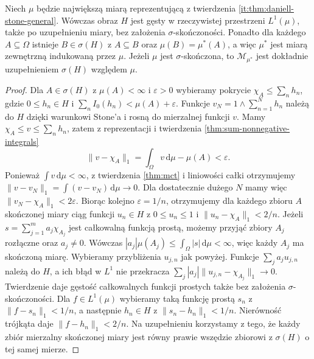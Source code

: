 \begin{wniosek}
\label{it:cor:daniell-general-density}
Niech $\mu$ będzie największą miarą reprezentującą
z twierdzenia \ref{it:thm:daniell-stone-general}.
Wówczas obraz $H$ jest gęsty w rzeczywistej
przestrzeni $L^1(\mu)$, także po uzupełnieniu miary,
bez założenia $\sigma$-skończoności.
Ponadto dla każdego $A\subseteq\Omega$ istnieje
$B\in\sigma(H)$ z $A\subseteq B$ oraz $\mu(B)=\mu^*(A)$,
a więc $\mu^*$ jest miarą zewnętrzną indukowaną przez $\mu$.
Jeżeli $\mu$ jest $\sigma$-skończona, to
$\mathcal M_{\mu^*}$ jest dokładnie uzupełnieniem
$\sigma(H)$ względem $\mu$.
\end{wniosek}
\begin{proof}
Dla $A\in\sigma(H)$ z $\mu(A)<\infty$ i $\varepsilon>0$
wybieramy pokrycie $\chi_A\le\sum_n h_n$, gdzie
$0\le h_n\in H$ i $\sum_n I_0(h_n)<\mu(A)+\varepsilon$.
Funkcje $v_N=1\wedge\sum_{n=1}^N h_n$ należą do $H$
dzięki warunkowi Stone'a i rosną do mierzalnej funkcji $v$.
Mamy $\chi_A\le v\le\sum_n h_n$, zatem z reprezentacji
i twierdzenia \ref{thm:sum-nonnegative-integrals}
\[
 \|v-\chi_A\|_1=\int_\Omega v\,\mathrm d\mu-\mu(A)
 <\varepsilon.
\]
Ponieważ $\int v\,\mathrm d\mu<\infty$, z twierdzenia
\ref{thm:mct} i liniowości całki otrzymujemy
$\|v-v_N\|_1=\int(v-v_N)\,\mathrm d\mu\to0$.
Dla dostatecznie dużego $N$ mamy więc
$\|v_N-\chi_A\|_1<2\varepsilon$.
Biorąc kolejno $\varepsilon=1/n$, otrzymujemy dla
każdego zbioru $A$ skończonej miary ciąg funkcji
$u_n\in H$ z $0\le u_n\le1$ i
$\|u_n-\chi_A\|_1<2/n$.
Jeżeli $s=\sum_{j=1}^m a_j\chi_{A_j}$ jest całkowalną
funkcją prostą, możemy przyjąć zbiory $A_j$ rozłączne
oraz $a_j\ne0$. Wówczas
$|a_j|\mu(A_j)\le\int_\Omega|s|\,\mathrm d\mu<\infty$,
więc każdy $A_j$ ma skończoną miarę. Wybieramy
przybliżenia $u_{j,n}$ jak powyżej. Funkcje
$\sum_j a_j u_{j,n}$ należą do $H$, a ich błąd
w $L^1$ nie przekracza
$\sum_j |a_j|\|u_{j,n}-\chi_{A_j}\|_1\to0$.
Twierdzenie
daje gęstość całkowalnych funkcji prostych także
bez założenia $\sigma$-skończoności.
Dla $f\in L^1(\mu)$ wybieramy taką funkcję prostą
$s_n$ z $\|f-s_n\|_1<1/n$, a następnie $h_n\in H$
z $\|s_n-h_n\|_1<1/n$. Nierówność trójkąta daje
$\|f-h_n\|_1<2/n$.
Na uzupełnieniu korzystamy z tego, że każdy zbiór
mierzalny skończonej miary jest równy prawie wszędzie
zbiorowi z $\sigma(H)$ o tej samej mierze.


\end{proof}
